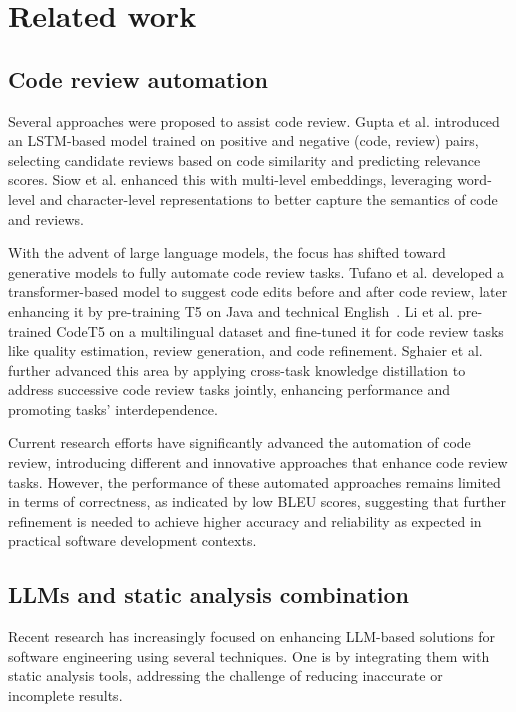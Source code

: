 \section{Related work}
\label{sec:literature}

\subsection{Code review automation}
Several approaches were proposed to assist code review. Gupta et al. \cite{gupta2018intelligent} introduced an LSTM-based model trained on positive and negative (code, review) pairs, selecting candidate reviews based on code similarity and predicting relevance scores. Siow et al. \cite{siow2020core} enhanced this with multi-level embeddings, leveraging word-level and character-level representations to better capture the semantics of code and reviews.

With the advent of large language models, the focus has shifted toward generative models to fully automate code review tasks. Tufano et al. \cite{tufan2021towards} developed a transformer-based model to suggest code edits before and after code review, later enhancing it by pre-training T5 on Java and technical English~\cite{tufano2022using}. Li et al. \cite{li2022automating} pre-trained CodeT5 on a multilingual dataset and fine-tuned it for code review tasks like quality estimation, review generation, and code refinement. Sghaier et al. \cite{ben2024improving} further advanced this area by applying cross-task knowledge distillation to address successive code review tasks jointly, enhancing performance and promoting tasks' interdependence.

Current research efforts have significantly advanced the automation of code review, introducing different and innovative approaches that enhance code review tasks. However, the performance of these automated approaches remains limited in terms of correctness, as indicated by low BLEU scores, suggesting that further refinement is needed to achieve higher accuracy and reliability as expected in practical software development contexts.


\subsection{LLMs and static analysis combination}

Recent research has increasingly focused on enhancing LLM-based solutions for software engineering using several techniques. One is by integrating them with static analysis tools, addressing the challenge of reducing inaccurate or incomplete results. 

